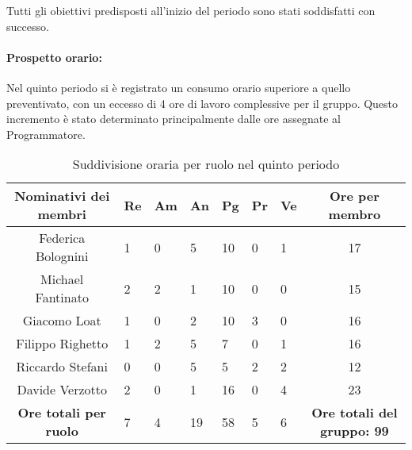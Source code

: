 Tutti gli obiettivi predisposti all'inizio del periodo sono stati soddisfatti con successo.\\

\newpage
\paragraph{Prospetto orario: }
Nel quinto periodo si è registrato un consumo orario superiore a quello preventivato, con un eccesso di 4 ore di lavoro complessive per il gruppo. Questo incremento è stato determinato principalmente dalle ore assegnate al Programmatore.
\begin{table}[h!]
    \centering
    \renewcommand{\arraystretch}{1.5}
    \begin{tabularx}{\textwidth}{|c|X|X|X|X|X|X|c|}\hline
    \rowcolor[HTML]{FFD700} 
    \textbf{Nominativi dei membri} & \textbf{Re} & \textbf{Am} & \textbf{An} & \textbf{Pg} & \textbf{Pr} & \textbf{Ve} & \textbf{Ore per membro} \\ \hline
    Federica Bolognini & 1 & 0 & 5 & 10 & 0 & 1 & 17  \\ \hline
    Michael Fantinato  & 2 & 2 & 1 & 10 & 0 & 0 & 15  \\ \hline
    Giacomo Loat       & 1 & 0 & 2 & 10 & 3 & 0 & 16 \\ \hline
    Filippo Righetto   & 1 & 2 & 5 & 7 & 0 & 1 & 16  \\ \hline
    Riccardo Stefani   & 0 & 0 & 5 & 5 & 2 & 2 & 12 \\ \hline
    Davide Verzotto    & 2 & 0 & 1 & 16 & 0 & 4 & 23  \\ \hline
    \rowcolor[HTML]{FFD700} 
    \textbf{Ore totali per ruolo} & 7 & 4 & 19 & 58 & 5 & 6 & \textbf{Ore totali del gruppo: 99} \\ \hline
    \end{tabularx}
    \caption{Suddivisione oraria per ruolo nel quinto periodo}
\end{table}

